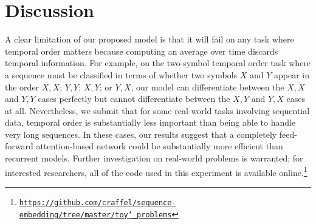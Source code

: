 \documentclass{article} %
\begin{document}
\section{Discussion}
\label{sec:limitations}

A clear limitation of our proposed model is that it will fail on any task where temporal order matters because computing an average over time discards temporal information.
For example, on the two-symbol temporal order task \cite{hochreiter1997long} where a sequence must be classified in terms of whether two symbols $X$ and $Y$ appear in the order $X, X$; $Y, Y$; $X, Y$; or $Y, X$, our model can differentiate between the $X, X$ and $Y, Y$ cases perfectly but cannot differentiate between the $X, Y$ and $Y, X$ cases at all.
Nevertheless, we submit that for some real-world tasks involving sequential data, temporal order is substantially less important than being able to handle very long sequences.
In these cases, our results suggest that a completely feed-forward attention-based network could be substantially more efficient than recurrent models.
Further investigation on real-world problems is warranted; for interested researchers, all of the code used in this experiment is available online.\footnote{\href{https://github.com/craffel/sequence-embedding/tree/master/toy_problems}{\texttt{https://github.com/craffel/sequence-embedding/tree/master/toy\char`_problems}}}


\small

\end{document}
